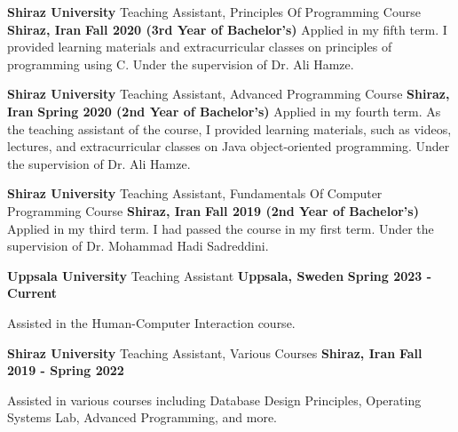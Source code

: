 \begin{cventries}
{    \cventry
    {\textbf{Shiraz University}} %
    {Teaching Assistant, Principles Of Programming Course} %
    {\textbf{Shiraz, Iran}} %
    {\textbf{Fall 2020 (3rd Year of Bachelor’s)}} %
    {
        Applied in my fifth term. I provided learning materials and extracurricular classes on principles of programming using C. Under the supervision of Dr. Ali Hamze.
    }

    \cventry
    {\textbf{Shiraz University}} %
    {Teaching Assistant, Advanced Programming Course} %
    {\textbf{Shiraz, Iran}} %
    {\textbf{Spring 2020 (2nd Year of Bachelor’s)}} %
    {
        Applied in my fourth term. As the teaching assistant of the course, I provided learning materials, such as videos, lectures, and extracurricular classes on Java object-oriented programming. Under the supervision of Dr. Ali Hamze.
    }

    \cventry
    {\textbf{Shiraz University}} %
    {Teaching Assistant, Fundamentals Of Computer Programming Course} %
    {\textbf{Shiraz, Iran}} %
    {\textbf{Fall 2019 (2nd Year of Bachelor’s)}} %
    {
        Applied in my third term. I had passed the course in my first term. Under the supervision of Dr. Mohammad Hadi Sadreddini.
    }
}
{ 
    \cventry
    {\textbf{Uppsala University}} %
    {Teaching Assistant} %
    {\textbf{Uppsala, Sweden}} %
    {\textbf{Spring 2023 - Current}} %
    {
      \begin{cvitems}
        \item Assisted in the Human-Computer Interaction course. 
      \end{cvitems}
    }
    
    \cventry
    {\textbf{Shiraz University}} %
    {Teaching Assistant, Various Courses} %
    {\textbf{Shiraz, Iran}} %
    {\textbf{Fall 2019 - Spring 2022}} %
    {
      \begin{cvitems}
        \item Assisted in various courses including Database Design Principles, Operating Systems Lab, Advanced Programming, and more.
      \end{cvitems}
    }
}
\end{cventries}
